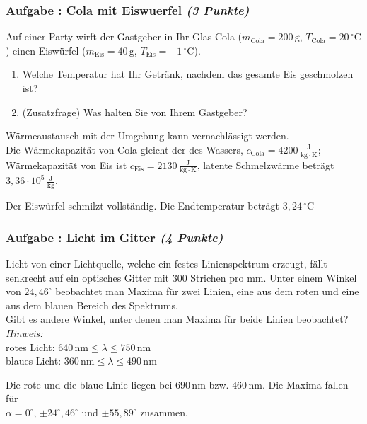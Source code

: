 \documentclass[12pt,a4paper]{article}
\newcommand{\ee}[1]{\cdot 10^{#1}}
\newcommand{\unit}[1]{\,\mathrm{#1}}
\newcommand{\degr}{^\circ}
\newcommand{\cel}{\,^\circ\mathrm{C}}
\newcommand{\hinweis}{\emph{Hinweis:} }
\newenvironment{abcenum}{\renewcommand{\labelenumi}{(\alph{enumi})} \begin{enumerate}}{\end{enumerate}\renewcommand{\labelenumi}{\theenumi .}}
\newcounter{numlabel}
\newenvironment{problem}[2]{\stepcounter{numlabel} \vspace{1ex} \subsubsection*{Aufgabe \the\value{numlabel}: #1 \emph{(#2 Punkte)}} \renewcommand{\Currentlabel}{Aufgabe \the\value{numlabel}: #1}}{

}
\begin{document}
\begin{problem}{Cola mit Eiswuerfel}{3}
Auf einer Party wirft der Gastgeber in Ihr Glas Cola ($m_\mathrm{Cola} = 200\unit{g}$, $T_\mathrm{Cola} = 20\cel$) einen Eiswürfel ($m_\mathrm{Eis} = 40\unit{g}$, $T_\mathrm{Eis} = -1\cel$).
\begin{abcenum}
\item Welche Temperatur hat Ihr Getränk, nachdem das gesamte Eis geschmolzen ist?
\item (Zusatzfrage) Was halten Sie von Ihrem Gastgeber?
\end{abcenum}
Wärmeaustausch mit der Umgebung kann vernachlässigt werden.\\
Die Wärmekapazität von Cola gleicht der des Wassers, $c_{\mathrm{Cola}} = 4200\unit{\frac{J}{kg \cdot K}}$; Wärmekapazität von Eis ist $c_{\mathrm{Eis}} = 2130\unit{\frac{J}{kg \cdot K}}$, latente Schmelzwärme beträgt $3,36\ee{5}\unit{\frac{J}{kg}}$.
\begin{solution}
Der Eiswürfel schmilzt vollständig. Die Endtemperatur beträgt $3,24\cel$
\end{solution}
\end{problem}


\begin{problem}{Licht im Gitter}{4}
Licht von einer Lichtquelle, welche ein festes Linienspektrum 
erzeugt, fällt senkrecht auf ein optisches Gitter mit $300$ Strichen 
pro mm. Unter einem Winkel von $24,46\degr$ beobachtet man Maxima 
für zwei Linien, eine aus dem roten und eine aus dem blauen Bereich des Spektrums.\\
Gibt es andere Winkel, unter denen man Maxima für beide Linien beobachtet?\\
\hinweis\\
rotes Licht: $640\unit{nm}\leq\lambda\leq750\unit{nm}$\\
blaues Licht: $360\unit{nm}\leq\lambda\leq490\unit{nm}$
\begin{solution}
Die rote und die blaue Linie liegen bei $690\unit{nm}$ bzw. $460\unit{nm}$. Die Maxima fallen für\\
$\alpha=0\degr$, $\pm24\degr,46\degr$ und $\pm55,89\degr$ zusammen.
\end{solution}
\end{problem}
\end{document}
